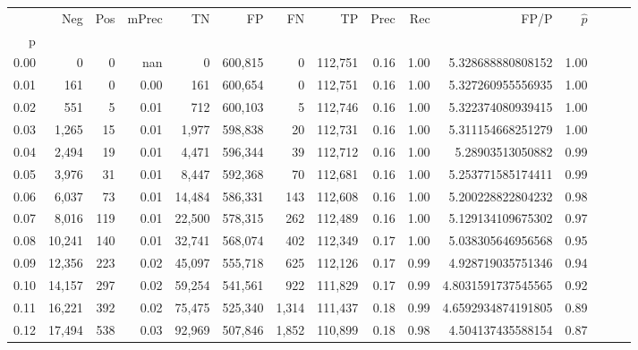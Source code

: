 \begin{tabular}{rrrrrrrrrrrrrrr}
\toprule
{} &     Neg &    Pos & mPrec &       TN &       FP &       FN &       TP &  Prec &   Rec &                    FP/P & $\hat{p}$ \\
p    &         &        &       &          &          &          &          &       &       &                         &           \\
\midrule
0.00 &       0 &      0 &   nan &        0 &  600,815 &        0 &  112,751 &  0.16 &  1.00 &       5.328688880808152 &      1.00 \\
0.01 &     161 &      0 &  0.00 &      161 &  600,654 &        0 &  112,751 &  0.16 &  1.00 &       5.327260955556935 &      1.00 \\
0.02 &     551 &      5 &  0.01 &      712 &  600,103 &        5 &  112,746 &  0.16 &  1.00 &       5.322374080939415 &      1.00 \\
0.03 &   1,265 &     15 &  0.01 &    1,977 &  598,838 &       20 &  112,731 &  0.16 &  1.00 &       5.311154668251279 &      1.00 \\
0.04 &   2,494 &     19 &  0.01 &    4,471 &  596,344 &       39 &  112,712 &  0.16 &  1.00 &        5.28903513050882 &      0.99 \\
0.05 &   3,976 &     31 &  0.01 &    8,447 &  592,368 &       70 &  112,681 &  0.16 &  1.00 &       5.253771585174411 &      0.99 \\
0.06 &   6,037 &     73 &  0.01 &   14,484 &  586,331 &      143 &  112,608 &  0.16 &  1.00 &       5.200228822804232 &      0.98 \\
0.07 &   8,016 &    119 &  0.01 &   22,500 &  578,315 &      262 &  112,489 &  0.16 &  1.00 &       5.129134109675302 &      0.97 \\
0.08 &  10,241 &    140 &  0.01 &   32,741 &  568,074 &      402 &  112,349 &  0.17 &  1.00 &       5.038305646956568 &      0.95 \\
0.09 &  12,356 &    223 &  0.02 &   45,097 &  555,718 &      625 &  112,126 &  0.17 &  0.99 &       4.928719035751346 &      0.94 \\
0.10 &  14,157 &    297 &  0.02 &   59,254 &  541,561 &      922 &  111,829 &  0.17 &  0.99 &      4.8031591737545565 &      0.92 \\
0.11 &  16,221 &    392 &  0.02 &   75,475 &  525,340 &    1,314 &  111,437 &  0.18 &  0.99 &      4.6592934874191805 &      0.89 \\
0.12 &  17,494 &    538 &  0.03 &   92,969 &  507,846 &    1,852 &  110,899 &  0.18 &  0.98 &       4.504137435588154 &      0.87 \\

\end{tabular}
